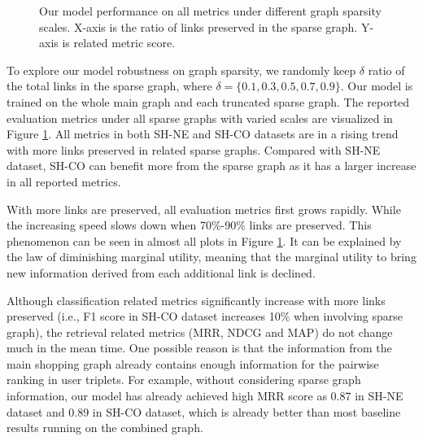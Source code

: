 \begin{figure}
	\caption{Our model performance on all metrics under different graph sparsity scales. X-axis is the ratio of links preserved in the sparse graph. Y-axis is related metric score.}
	\label{fig:sparsenss}
\end{figure}
To explore our model robustness on graph sparsity, we randomly keep $\delta$ ratio of the total links in the sparse graph, where  $\delta=\{0.1,0.3,0.5,0.7,0.9\}$. Our model is trained on the whole main graph and each truncated sparse graph. The reported evaluation metrics under all sparse graphs with varied scales are visualized in Figure \ref{fig:sparsenss}. All metrics in both SH-NE and SH-CO datasets are in a rising trend with more links preserved in related sparse graphs. Compared with SH-NE dataset, SH-CO can benefit more from the sparse graph as it has a larger increase in all reported metrics. 

With more links are preserved, all evaluation metrics first grows rapidly. While the increasing speed slows down when 70\%-90\% links are preserved. This phenomenon can be seen in almost all plots in Figure \ref{fig:sparsenss}. It can be explained by the law of diminishing marginal utility, meaning that the marginal utility to bring new information derived from each additional link is declined.

Although classification related  metrics significantly increase with more links preserved (i.e., F1 score in SH-CO dataset increases 10\% when involving sparse graph), the retrieval related metrics (MRR, NDCG and MAP) do not change much in the mean time. One possible reason is that the information from the main shopping graph already contains enough information for the pairwise ranking in user triplets. For example, without considering sparse graph information, our model has already achieved high MRR score as 0.87 in SH-NE dataset and 0.89 in SH-CO dataset, which is already better than most baseline results running on the combined graph.



